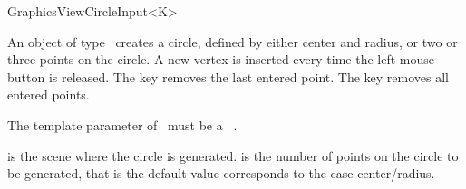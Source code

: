 \begin{ccRefClass}[Qt::]{GraphicsViewCircleInput<K>}

\ccDefinition
An object of type \ccRefName\ creates a circle, defined by either
center and radius, or two or three points on the circle. A new 
vertex is inserted every time the left mouse button is released.
The  key removes the last entered point. The  
key removes all entered points.



\ccParameters

The template parameter of \ccRefName\ must be a \cgal\ . 

\ccInheritsFrom
{}

\ccGlue

\ccCreation
{}

{ is the scene where the circle is generated.  is the
  number of points on the circle to be generated, that is the default value 
  corresponds to the case center/radius.}



\end{ccRefClass}







